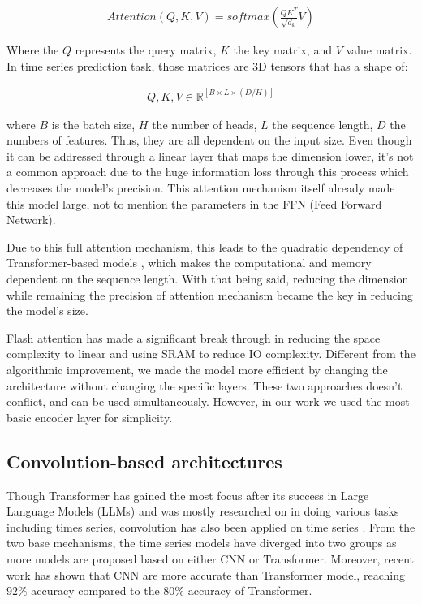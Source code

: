 \documentclass[stu,12pt,floatsintext]{apa7}
\begin{document}
\begin{gather}
    Attention(Q,K,V)=softmax(\frac{QK^T}{\sqrt{d_k}}V)
\end{gather}

Where the $Q$ represents the query matrix, $K$ the key matrix, and $V$ value matrix. In time series prediction task, those matrices are 3D tensors that has a shape of:

\begin{gather}
        Q,K,V\in \mathbb{R}^{[B\times L\times (D/H)]}
\end{gather}

where $B$ is the batch size, $H$ the number of heads, $L$ the sequence length, $D$ the numbers of features. Thus, they are all dependent on the input size. Even though it can be addressed through a linear layer that maps the dimension lower, it's not a common approach due to the huge information loss through this process which decreases the model's precision. This attention mechanism itself already made this model large, not to mention the parameters in the FFN (Feed Forward Network). 

Due to this full attention mechanism, this leads to the quadratic dependency of Transformer-based models \parencite{bigbird}, which makes the computational and memory dependent on the sequence length. With that being said, reducing the dimension while remaining the precision of attention mechanism became the key in reducing the model's size. 

Flash attention has made a significant break through in reducing the space complexity to linear and using SRAM to reduce IO complexity. Different from the algorithmic improvement, we made the model more efficient by changing the architecture without changing the specific layers. These two approaches doesn't conflict, and can be used simultaneously. However, in our work we used the most basic encoder layer for simplicity. 

\subsection{Convolution-based architectures}

Though Transformer has gained the most focus after its success in Large Language Models (LLMs) and was mostly researched on in doing various tasks including times series, convolution has also been applied on time series \parencite{hewage2020temporal}. From the two base mechanisms, the time series models have diverged into two groups as more models are proposed based on either CNN or Transformer. Moreover, recent work \parencite{cnntransformercompare} has shown that CNN are more accurate than Transformer model, reaching $92\%$ accuracy compared to the $80\%$ accuracy of Transformer. 
\end{document}
